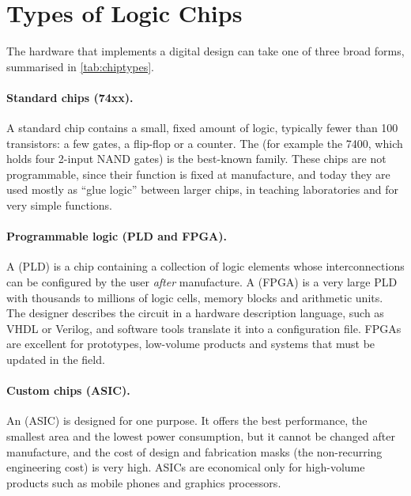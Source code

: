 \section{Types of Logic Chips}\label{sec:chiptypes}
The hardware that implements a digital design can take one of three broad forms, summarised in \cref{tab:chiptypes}.

\paragraph{Standard chips (74xx).} A standard chip contains a small, fixed amount of logic, typically fewer than 100 transistors: a few gates, a flip-flop or a counter. The  (for example the 7400, which holds four 2-input NAND gates) is the best-known family. These chips are not programmable, since their function is fixed at manufacture, and today they are used mostly as ``glue logic'' between larger chips, in teaching laboratories and for very simple functions.

\paragraph{Programmable logic (PLD and FPGA).} A  (PLD) is a chip containing a collection of logic elements whose interconnections can be configured by the user \emph{after} manufacture. A  (FPGA) is a very large PLD with thousands to millions of logic cells, memory blocks and arithmetic units. The designer describes the circuit in a hardware description language, such as VHDL or Verilog, and software tools translate it into a configuration file. FPGAs are excellent for prototypes, low-volume products and systems that must be updated in the field.

\paragraph{Custom chips (ASIC).} An  (ASIC) is designed for one purpose. It offers the best performance, the smallest area and the lowest power consumption, but it cannot be changed after manufacture, and the cost of design and fabrication masks (the non-recurring engineering cost) is very high. ASICs are economical only for high-volume products such as mobile phones and graphics processors.

